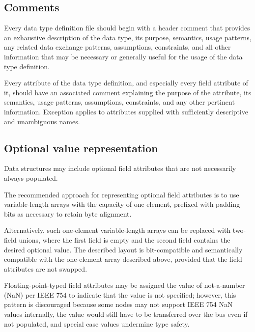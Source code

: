 \subsection{Comments}

Every data type definition file should begin with a header comment that provides an exhaustive description
of the data type, its purpose, semantics, usage patterns, any related data exchange patterns,
assumptions, constraints, and all other information that may be necessary or generally useful for the usage of the
data type definition.

Every attribute of the data type definition, and especially every field attribute of it,
should have an associated comment explaining the purpose of the attribute, its semantics, usage patterns,
assumptions, constraints, and any other pertinent information.
Exception applies to attributes supplied with sufficiently descriptive and unambiguous names.


\subsection{Optional value representation}

Data structures may include optional field attributes that are not necessarily always populated.

The recommended approach for representing optional field attributes
is to use variable-length arrays with the capacity of one element,
prefixed with padding bits as necessary to retain byte alignment.

Alternatively, such one-element variable-length arrays can be replaced with two-field unions,
where the first field is empty and the second field contains the desired optional value.
The described layout is bit-compatible and semantically compatible with the one-element array described above,
provided that the field attributes are not swapped.

Floating-point-typed field attributes may be assigned the value of not-a-number (NaN) per IEEE 754
to indicate that the value is not specified;
however, this pattern is discouraged because some nodes may not support IEEE 754 NaN values internally,
the value would still have to be transferred over the bus even if not populated,
and special case values undermine type safety.

